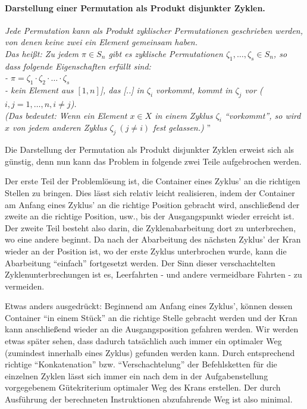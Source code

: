 \paragraph{Darstellung einer Permutation als Produkt disjunkter Zyklen.}
\emph{Jede Permutation kann als Produkt zyklischer Permutationen geschrieben werden, von denen keine zwei ein Element gemeinsam haben.}\\
\emph{Das heißt: Zu jedem $\pi \in S_n$ gibt es zyklische Permutationen $\zeta_1,\dots,\zeta_s \in S_n$,
so dass folgende Eigenschaften erfüllt sind: \\
 - $\pi=\zeta_1\cdot \zeta_2 \cdot \ldots \cdot \zeta_s$ \\
 - kein Element aus $[1,n]$], das [..] in $\zeta_i$ vorkommt, kommt in $\zeta_j$ vor ($i,j=1, \dots,n, i \neq j$).\\
(Das bedeutet: Wenn ein Element $x \in X$ in einem Zyklus $\zeta_i$ ``vorkommt'',
 so wird $x$ von jedem anderen Zyklus $\zeta_j \: (j \neq i)$ fest gelassen.)
}''

Die Darstellung der Permutation als Produkt disjunkter Zyklen erweist sich als günstig,
denn nun kann das Problem in folgende zwei Teile aufgebrochen werden.

Der erste Teil der Problemlösung ist, die Container eines Zyklus' an die richtigen Stellen zu bringen.
Dies lässt sich relativ leicht realisieren, indem der Container am Anfang eines Zyklus' an die richtige Position gebracht wird,
anschließend der zweite an die richtige Position, usw., bis der Ausgangspunkt wieder erreicht ist.
Der zweite Teil besteht also darin, die Zyklenabarbeitung dort zu unterbrechen, wo eine andere beginnt.
Da nach der Abarbeitung des nächsten Zyklus' der Kran wieder an der Position ist,
wo der erste Zyklus unterbrochen wurde, kann die Abarbeitung ``einfach'' fortgesetzt werden.
Der Sinn dieser verschachtelten Zyklenunterbrechungen ist es, Leerfahrten - und andere vermeidbare Fahrten - zu vermeiden.

Etwas anders ausgedrückt:
Beginnend am Anfang eines Zyklus', können dessen Container ``in einem Stück'' an die richtige Stelle gebracht werden
 und der Kran kann anschließend wieder an die Ausgangsposition gefahren werden.
Wir werden etwas später sehen, dass dadurch tatsächlich auch immer ein optimaler Weg (zumindest innerhalb eines Zyklus) gefunden werden kann.
Durch entsprechend richtige ``Konkatenation'' bzw. ``Verschachtelung'' der Befehlsketten für die einzelnen Zyklen lässt sich immer
 ein nach dem in der Aufgabenstellung vorgegebenem Gütekriterium optimaler Weg des Krans erstellen.
Der durch Ausführung der berechneten Instruktionen abzufahrende Weg ist also minimal.
